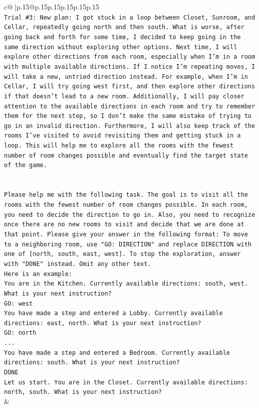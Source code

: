 \documentclass{article}
\begin{document}
{\begin{supertabular}{c@{$\;$}|p{.15\linewidth}@{}p{.15\linewidth}p{.15\linewidth}p{.15\linewidth}p{.15\linewidth}p{.15\linewidth}}
{{{\\ 
\texttt{Trial \#3: New plan: I got stuck in a loop between Closet, Sunroom, and Cellar, repeatedly going north and then south. What is worse, after going back and forth for some time, I decided to keep going in the same direction without exploring other options. Next time, I will explore other directions from each room, especially when I'm in a room with multiple available directions. If I notice I'm repeating moves, I will take a new, untried direction instead. For example, when I'm in Cellar, I will try going west first, and then explore other directions if that doesn't lead to a new room. Additionally, I will pay closer attention to the available directions in each room and try to remember them for the next step, so I don't make the same mistake of trying to go in an invalid direction. Furthermore, I will also keep track of the rooms I've visited to avoid revisiting them and getting stuck in a loop. This will help me to explore all the rooms with the fewest number of room changes possible and eventually find the target state of the game.} \\
\\ 
\\ 
\texttt{Please help me with the following task. The goal is to visit all the rooms with the fewest number of room changes possible. In each room, you need to decide the direction to go in. Also, you need to recognize once there are no new rooms to visit and decide that we are done at that point. Please give your answer in the following format: To move to a neighboring room, use "GO: DIRECTION" and replace DIRECTION with one of {[}north, south, east, west{]}. To stop the exploration, answer with "DONE" instead. Omit any other text.} \\
\texttt{Here is an example:} \\
\texttt{You are in the Kitchen. Currently available directions: south, west. What is your next instruction?} \\
\texttt{GO: west} \\
\texttt{You have made a step and entered a Lobby. Currently available directions: east, north. What is your next instruction?} \\
\texttt{GO: north} \\
\texttt{...} \\
\texttt{You have made a step and entered a Bedroom. Currently available directions: south. What is your next instruction?} \\
\texttt{DONE} \\
\texttt{Let us start. You are in the Closet. Currently available directions: north, south. What is your next instruction?} \\
            }
        }
    }
    & \\ \\


\end{supertabular}}
\end{document}

